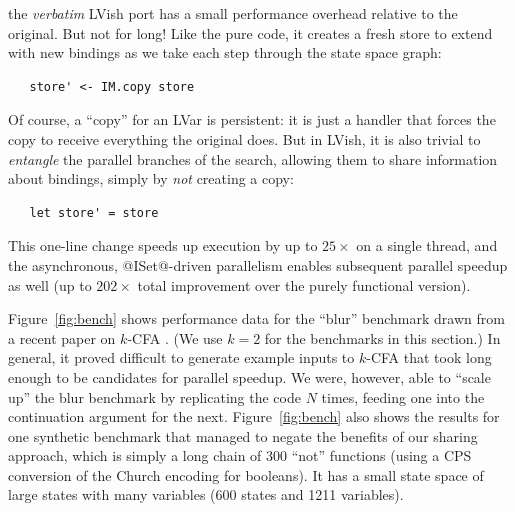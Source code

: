 the {\em verbatim} LVish port has a small performance overhead relative to the
 original.  But not for long!
  Like the
pure code, it creates a fresh store to extend with new bindings as we take each
step through the state space graph:
\begin{lstlisting}
   store' <- IM.copy store 
\end{lstlisting}
Of course, a ``copy'' for an LVar is persistent: it is just a handler that
forces the copy to receive everything the original does.  But in LVish, it is
also trivial to {\em entangle} the parallel branches of the search, allowing them to
share information about bindings, simply by {\em not} creating a copy:
\begin{lstlisting}
   let store' = store 
\end{lstlisting}
This one-line change speeds up execution by up to $25\times$ on a single thread, and the
asynchronous, @ISet@-driven parallelism enables subsequent parallel speedup as well
(up to $202\times$ total improvement over the purely functional version).

Figure~\ref{fig:bench} shows performance data for the ``blur'' benchmark drawn
from a recent paper on $k$-CFA \cite{earl-might-icfp-2012}.  (We use $k=2$ for the
benchmarks in this section.)  In general, it proved difficult to generate
example inputs to $k$-CFA that took long enough to be candidates for parallel
speedup.  We were, however, able to ``scale up'' the blur benchmark by
replicating the code $N$ times, feeding one into the continuation argument for
the next.  Figure~\ref{fig:bench} also shows the results for one synthetic benchmark
that managed to negate the
benefits of our sharing approach, which is simply a long chain of $300$ ``not''
functions (using a CPS conversion of the Church encoding for booleans).  It has a small state space of large states with many
variables (600 states and 1211 variables).


